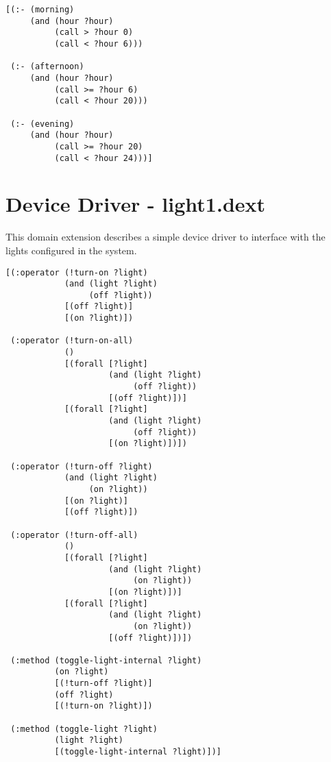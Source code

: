\begin{lstlisting}
[(:- (morning)
     (and (hour ?hour)
          (call > ?hour 0)
          (call < ?hour 6)))

 (:- (afternoon)
     (and (hour ?hour)
          (call >= ?hour 6)
          (call < ?hour 20)))

 (:- (evening)
     (and (hour ?hour)
          (call >= ?hour 20)
          (call < ?hour 24)))]
\end{lstlisting}

\section{Device Driver - light1.dext}
This domain extension describes a simple device driver to interface with the
lights configured in the system.

\begin{lstlisting}
[(:operator (!turn-on ?light)
            (and (light ?light)
                 (off ?light))
            [(off ?light)]
            [(on ?light)])

 (:operator (!turn-on-all)
            ()
            [(forall [?light]
                     (and (light ?light)
                          (off ?light))
                     [(off ?light)])]
            [(forall [?light]
                     (and (light ?light)
                          (off ?light))
                     [(on ?light)])])

 (:operator (!turn-off ?light)
            (and (light ?light)
                 (on ?light))
            [(on ?light)]
            [(off ?light)])

 (:operator (!turn-off-all)
            ()
            [(forall [?light]
                     (and (light ?light)
                          (on ?light))
                     [(on ?light)])]
            [(forall [?light]
                     (and (light ?light)
                          (on ?light))
                     [(off ?light)])])

 (:method (toggle-light-internal ?light)
          (on ?light)
          [(!turn-off ?light)]
          (off ?light)
          [(!turn-on ?light)])

 (:method (toggle-light ?light)
          (light ?light)
          [(toggle-light-internal ?light)])]
\end{lstlisting}

